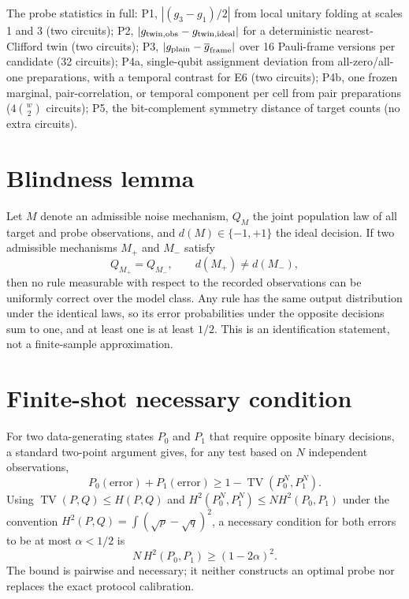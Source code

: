 \documentclass[10pt,twocolumn]{article}
\begin{document}
The probe statistics in full: P1, $|(g_3-g_1)/2|$ from local unitary folding at
scales 1 and 3 (two circuits); P2, $|g_{\rm twin,obs}-g_{\rm twin,ideal}|$ for a
deterministic nearest-Clifford twin (two circuits); P3,
$|g_{\rm plain}-\overline{g}_{\rm frame}|$ over 16 Pauli-frame versions per
candidate (32 circuits); P4a, single-qubit assignment deviation from
all-zero/all-one preparations, with a temporal contrast for E6 (two circuits);
P4b, one frozen marginal, pair-correlation, or temporal component per cell from
pair preparations ($4\binom{w}{2}$ circuits); P5, the bit-complement symmetry
distance of target counts (no extra circuits).

\section{Blindness lemma}

Let $M$ denote an admissible noise mechanism, $Q_M$ the joint population law
of all target and probe observations, and $d(M)\in\{-1,+1\}$ the ideal decision.
If two admissible mechanisms $M_+$ and $M_-$ satisfy
\begin{equation}
  Q_{M_+}=Q_{M_-},\qquad d(M_+)\neq d(M_-),
\end{equation}
then no rule measurable with respect to the recorded observations can be
uniformly correct over the model class. Any rule has the same output
distribution under the identical laws, so its error probabilities under the
opposite decisions sum to one, and at least one is at least $1/2$. This is an
identification statement, not a finite-sample approximation.

\section{Finite-shot necessary condition}

For two data-generating states $P_0$ and $P_1$ that require opposite binary
decisions, a standard two-point argument\cite{lecam1973} gives, for any test
based on $N$ independent observations,
\begin{equation}
  P_0(\text{error})+P_1(\text{error})
  \ge 1-\operatorname{TV}(P_0^{N},P_1^{N}).
\end{equation}
Using $\operatorname{TV}(P,Q)\le H(P,Q)$ and
$H^2(P_0^N,P_1^N)\le N H^2(P_0,P_1)$ under the convention
$H^2(P,Q)=\int(\sqrt p-\sqrt q)^2$, a necessary condition for both errors to
be at most $\alpha<1/2$ is
\begin{equation}
  N\,H^2(P_0,P_1)\ge (1-2\alpha)^2.
\end{equation}
The bound is pairwise and necessary; it neither constructs an optimal probe nor
replaces the exact protocol calibration.
\end{document}
